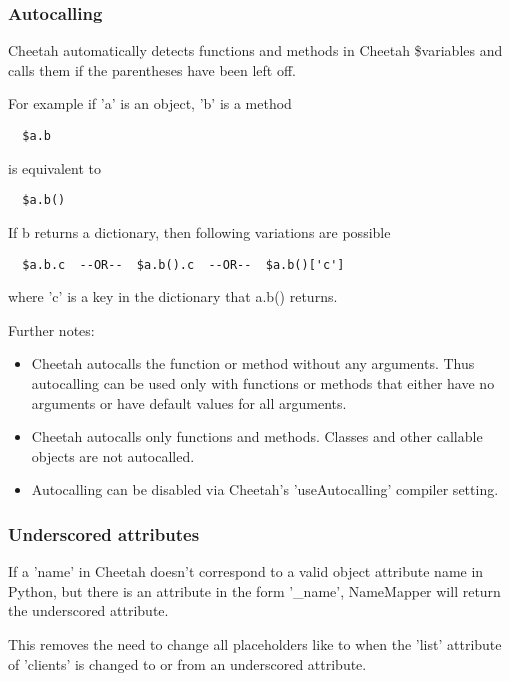 \subsubsection{Autocalling}
\label{language.namemapper.autocalling}

Cheetah automatically detects functions and methods in Cheetah \$variables and calls
them if the parentheses have been left off.  

For example if 'a' is an object, 'b' is a method
\begin{verbatim}
  $a.b
\end{verbatim}

is equivalent to

\begin{verbatim}
  $a.b()
\end{verbatim}

If b returns a dictionary, then following variations are possible
\begin{verbatim}
  $a.b.c  --OR--  $a.b().c  --OR--  $a.b()['c']
\end{verbatim}
where 'c' is a key in the dictionary that a.b() returns.

Further notes:
\begin{itemize}
\item Cheetah autocalls the function or method without any arguments.  Thus
autocalling can be used only with functions or methods that either have no
arguments or have default values for all arguments.

\item Cheetah autocalls only functions and methods.  Classes and other callable
objects are not autocalled.  

\item Autocalling can be disabled via Cheetah's 'useAutocalling' compiler
setting.
\end{itemize}

\subsubsection{Underscored attributes}
\label{language.namemapper.underscore}

If a 'name' in Cheetah doesn't correspond to a valid object attribute name in
Python, but there is an attribute in the form '\_name', NameMapper will return
the underscored attribute.

This removes the need to change all placeholders like  to
 when the 'list' attribute of 'clients' is changed to or
from an underscored attribute.


